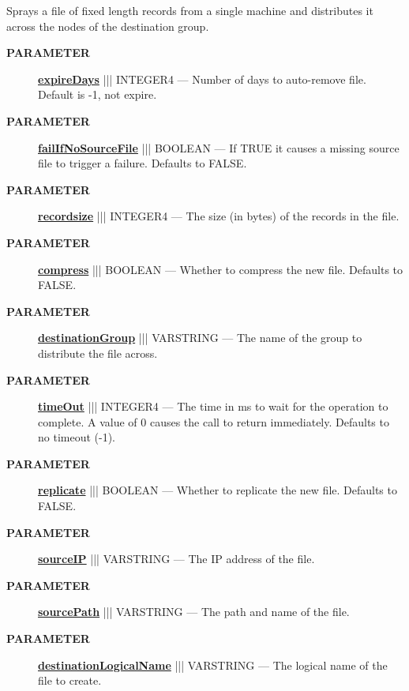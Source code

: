 \par





Sprays a file of fixed length records from a single machine and distributes it across the nodes of the destination group.






\par
\begin{description}
\item [\colorbox{tagtype}{\color{white} \textbf{\textsf{PARAMETER}}}] \textbf{\underline{expireDays}} ||| INTEGER4 --- Number of days to auto-remove file. Default is -1, not expire.
\item [\colorbox{tagtype}{\color{white} \textbf{\textsf{PARAMETER}}}] \textbf{\underline{failIfNoSourceFile}} ||| BOOLEAN --- If TRUE it causes a missing source file to trigger a failure. Defaults to FALSE.
\item [\colorbox{tagtype}{\color{white} \textbf{\textsf{PARAMETER}}}] \textbf{\underline{recordsize}} ||| INTEGER4 --- The size (in bytes) of the records in the file.
\item [\colorbox{tagtype}{\color{white} \textbf{\textsf{PARAMETER}}}] \textbf{\underline{compress}} ||| BOOLEAN --- Whether to compress the new file. Defaults to FALSE.
\item [\colorbox{tagtype}{\color{white} \textbf{\textsf{PARAMETER}}}] \textbf{\underline{destinationGroup}} ||| VARSTRING --- The name of the group to distribute the file across.
\item [\colorbox{tagtype}{\color{white} \textbf{\textsf{PARAMETER}}}] \textbf{\underline{timeOut}} ||| INTEGER4 --- The time in ms to wait for the operation to complete. A value of 0 causes the call to return immediately. Defaults to no timeout (-1).
\item [\colorbox{tagtype}{\color{white} \textbf{\textsf{PARAMETER}}}] \textbf{\underline{replicate}} ||| BOOLEAN --- Whether to replicate the new file. Defaults to FALSE.
\item [\colorbox{tagtype}{\color{white} \textbf{\textsf{PARAMETER}}}] \textbf{\underline{sourceIP}} ||| VARSTRING --- The IP address of the file.
\item [\colorbox{tagtype}{\color{white} \textbf{\textsf{PARAMETER}}}] \textbf{\underline{sourcePath}} ||| VARSTRING --- The path and name of the file.
\item [\colorbox{tagtype}{\color{white} \textbf{\textsf{PARAMETER}}}] \textbf{\underline{destinationLogicalName}} ||| VARSTRING --- The logical name of the file to create.

\end{description}
